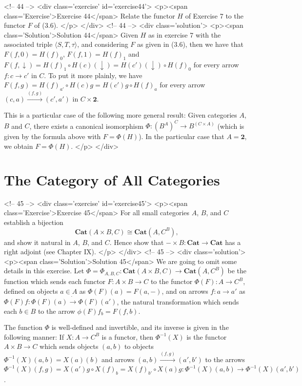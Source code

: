 <!-- 44 -->
<div class='exercise' id='exercise44'>
<p><span class='Exercise'>Exercise 44</span>
Relate the functor $H$ of Exercise 7 to the functor $F$ of (3.6).
</p>
</div>
<!-- 44 -->
<div class='solution'>
<p><span class='Solution'>Solution 44</span>
Given $H$ as in exercise 7 with the associated triple $\langle S,T,\tau\rangle$, and considering $F$ as given in (3.6), then we have that $F(f,0)=H(f)_0$, $F(f,1)=H(f)_1$ and $F(f,\downarrow)=H(f)_1\circ H(c)(\downarrow)=H(c')(\downarrow)\circ H(f)_0$ for every arrow $f:c\to c'$ in $C$. To put it more plainly, we have $F(f,g)=H(f)_{a'}\circ H(c)g=H(c')g\circ H(f)_a$ for every arrow $(c,a)\overset{(f,g)}{\to}(c',a')$ in $C\times\mathbf{2}$.

This is a particular case of the following more general result: Given categories $A$, $B$ and $C$, there exists a canonical isomorphism $\Phi:(B^A)^C\to B^(C\times A)$ (which is given by the formula above with $F=\Phi(H)$). In the particular case that $A=\mathbf{2}$, we obtain $F=\Phi(H)$.
</p>
</div>

\section{The Category of All Categories}

<!-- 45 -->
<div class='exercise' id='exercise45'>
<p><span class='Exercise'>Exercise 45</span>
For all small categories $A$, $B$, and $C$ establish a bijection
\[\mathbf{Cat}(A\times B,C)\cong\mathbf{Cat}(A,C^B),\]
and show it natural in $A$, $B$, and $C$. Hence show that $-\times B:\mathbf{Cat}\to\mathbf{Cat}$ has a right adjoint (see Chapter IX).
</p>
</div>
<!-- 45 -->
<div class='solution'>
<p><span class='Solution'>Solution 45</span>
We are going to omit some details in this exercise. Let $\Phi=\Phi_{A,B,C}:\mathbf{Cat}(A\times B,C)\to\mathbf{Cat}(A,C^B)$ be the function which sends each functor $F:A\times B\to C$ to the functor $\Phi(F):A\to C^B$, defined on objects $a\in A$ as $\Phi(F)(a)=F(a,-)$, and on arrows $f:a\to a'$ as $\Phi(F)f:\Phi(F)(a)\dot{\to}\Phi(F)(a')$, the natural transformation which sends each $b\in B$ to the arrow $\phi(F)f_b=F(f,b)$.

The function $\Phi$ is well-defined and invertible, and its inverse is given in the following manner: If $X:A\to C^B$ is a functor, then $\Phi^{-1}(X)$ is the functor $A\times B\to C$ which sends objects $(a,b)$ to objects $\Phi^{-1}(X)(a,b)=X(a)(b)$ and  arrows $(a,b)\overset{(f,g)}{\to}(a',b')$ to the arrows $\Phi^{-1}(X)(f,g)=X(a')g\circ X(f)_b=X(f)_{b'}\circ X(a)g:\Phi^{-1}(X)(a,b)\to\Phi^{-1}(X)(a',b')$.

